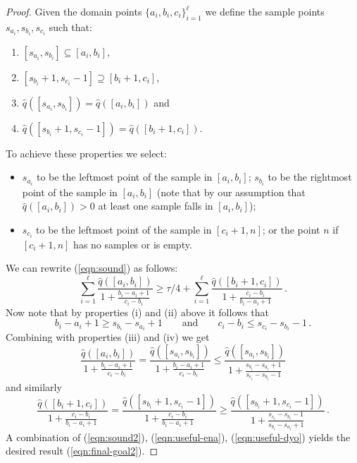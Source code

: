 \documentclass[10pt]{article}
\theoremstyle{definition}
\numberwithin{equation}{section}
\newcommand{\wh}[1]{{\widehat{#1}}}
\begin{document}
\begin{proof}
{{Given the domain points $\{a_i, b_i, c_i\}_{i=1}^{\ell}$ we define the sample points $s_{a_i}, s_{b_i}, s_{c_i}$ such that:
\begin{enumerate}
\item[(i)] $[s_{a_i}, s_{b_i}] \subseteq [a_i, b_i]$, 
\item[(ii)] $[s_{b_i}+1, s_{c_i}-1] \supseteq [b_i+1, c_i]$, 
\item[(iii)] $\wh{q}([s_{a_i}, s_{b_i}]) =  \wh{q}([a_i, b_i])$ and 
\item[(iv)] $\wh{q}([s_{b_i}+1, s_{c_i}-1]) =  \wh{q}([b_i+1, c_i])$.
\end{enumerate}
To achieve these properties we select:
\begin{itemize}
\item $s_{a_i}$ to be the leftmost point of the sample in $[a_i,
  b_i]$; $s_{b_i}$ to be the rightmost point of the sample in
%
%
%
 $[a_i, b_i]$ (note that by our assumption that $\wh{q}([a_i, b_i])>0$ at least one sample falls in $[a_i, b_i]$); 
%
\item $s_{c_i}$ to be the leftmost point of the sample in $[c_i+1, n]$; or the point $n$ if $[c_i+1, n]$ has no samples or is empty.
\end{itemize}
We can rewrite (\ref{eqn:sound}) as follows:
\begin{equation} \label{eqn:sound2}
\sum_{i=1}^{\ell} \frac{\wh{q}([a_i, b_i])}{1+ \frac{b_i-a_i+1}{c_i-b_i}} \ge \tau/4 + \sum_{i=1}^{\ell} \frac{\wh{q}([b_i+1, c_i])}{1+ \frac{c_i-b_i}{b_i-a_i+1}}\,.
\end{equation}
Now note that by properties (i) and (ii) above it follows that
\[
b_i-a_i+1\ge s_{b_i} - s_{a_i}+1\qquad\text{and}\qquad
c_i-b_i \le s_{c_i} - s_{b_i}-1\,.
\]
Combining with properties
(iii) and (iv) we get 
\begin{equation} \label{eqn:useful-ena}
\frac{\wh{q}([a_i, b_i])}{1+ \frac{b_i-a_i+1}{c_i-b_i}} = \frac{\wh{q}([s_{a_i}, s_{b_i}])}{1+ \frac{b_i-a_i+1}{c_i-b_i}} \le  
\frac{\wh{q}([s_{a_i}, s_{b_i}])}{1+ \frac{s_{b_i}-s_{a_i}+1}{s_{c_i}-s_{b_i}-1}}
\end{equation}
and similarly
\begin{equation} \label{eqn:useful-dyo}
\frac{\wh{q}([b_i+1, c_i])}{1+ \frac{c_i-b_i}{b_i-a_i+1}} = \frac{\wh{q}([s_{b_i}+1, s_{c_i}-1])}{1+ \frac{c_i-b_i}{b_i-a_i+1}} \ge  
\frac{\wh{q}([s_{b_i}+1, s_{c_i}-1])}{1+ \frac{s_{c_i}-s_{b_i}-1}{s_{b_i}-s_{a_i}+1}}\,.
\end{equation}
A combination of (\ref{eqn:sound2}), (\ref{eqn:useful-ena}), (\ref{eqn:useful-dyo}) yields the
desired result (\ref{eqn:final-goal2}).  


}}
\end{proof}
\end{document}

